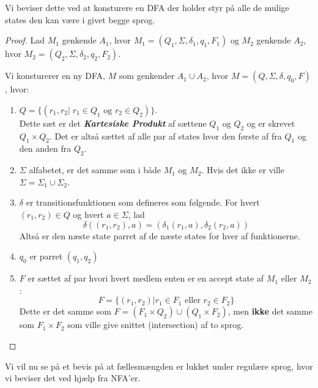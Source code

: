 Vi beviser dette ved at konsturere en DFA der holder styr på alle de mulige states den kan være i givet begge sprog.

\begin{proof}
  Lad $M_{1}$ genkende $A_{1}$, hvor $M_{1} = (Q_{1}, \Sigma, \delta_{1}, q_{1}, F_{1})$ og $M_{2}$ genkende $A_{2}$, hvor $M_{2} = (Q_{2}, \Sigma, \delta_{2}, q_{2}, F_{2})$.

  Vi konsturerer en ny DFA, $M$ som genkender $A_{1} \cup A_{2}$, hvor $M = (Q, \Sigma, \delta, q_{0}, F)$, hvor:
  \begin{enumerate}
\item $Q = \{(r_{1}, r_{2}| \; r_{1} \in Q_{1} \text{ og } r_{2} \in Q_{2})\}$. \\
          Dette sæt er det \textit{\textbf{Kartesiske Produkt}} af sættene $Q_{1}$ og $Q_{2}$ og er skrevet $Q_{1} \times Q_2$. Det er altså sættet af alle par af states hvor den første af fra $Q_{1}$ og den anden fra $Q_{2}$.
    \item $\Sigma$ alfabetet, er det samme som i både $M_1$ og $M_{2}$. Hvis det ikke er ville $\Sigma = \Sigma_{1} \cup \Sigma_{2}$.
    \item $\delta$ er transitionsfunktionen som defineres som følgende. For hvert $(r_{1}, r_{2}) \in Q$ og hvert $a \in \Sigma$, lad
          \[\delta \left( (r_{1}, r_{2}), a \right) = \left(\delta_{1} (r_{1}, a), \delta_{2}(r_{2}, a) \right)\] Altså er den næste state parret af de næste states for hver af funktionerne.
    \item $q_{0}$ er parret $(q_{1}, q_{2})$
    \item $F$ er sættet af par hvori hvert medlem enten er en accept state af $M_1$ eller $M_{2}$: \[ F = \{(r_{1}, r_{2})| r_{1} \in F_{1} \text{ eller } r_{2} \in F_{2}\} \]
          Dette er det samme som $F = (F_{1} \times Q_{2}) \cup (Q_{1} \times F_{2})$, men \textbf{ikke} det samme som $F_{1} \times F_{2}$ som ville give snittet (intersection) af to sprog.
  \end{enumerate}
\end{proof}

Vi vil nu se på et bevis på at fællesmængden er lukket under regulære sprog, hvor vi beviser det ved hjælp fra NFA'er.


